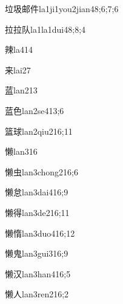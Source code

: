 \begin{verbete}{垃圾邮件}{la1ji1you2jian4}{8;6;7;6}
\end{verbete}
\begin{verbete}{拉拉队}{la1la1dui4}{8;8;4}
\end{verbete}
\begin{verbete}{辣}{la4}{14}
\end{verbete}
\begin{verbete}{来}{lai2}{7}
\end{verbete}
\begin{verbete}{蓝}{lan2}{13}
\end{verbete}
\begin{verbete}{蓝色}{lan2se4}{13;6}
\end{verbete}
\begin{verbete}{篮球}{lan2qiu2}{16;11}
\end{verbete}
\begin{verbete}{懒}{lan3}{16}
\end{verbete}
\begin{verbete}{懒虫}{lan3chong2}{16;6}
\end{verbete}
\begin{verbete}{懒怠}{lan3dai4}{16;9}
\end{verbete}
\begin{verbete}{懒得}{lan3de2}{16;11}
\end{verbete}
\begin{verbete}{懒惰}{lan3duo4}{16;12}
\end{verbete}
\begin{verbete}{懒鬼}{lan3gui3}{16;9}
\end{verbete}
\begin{verbete}{懒汉}{lan3han4}{16;5}
\end{verbete}
\begin{verbete}{懒人}{lan3ren2}{16;2}
\end{verbete}
